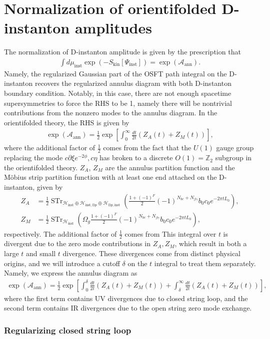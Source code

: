 \documentclass[12pt]{article}
\newcommand{\ie}{\begin{equation}\begin{aligned}}
\newcommand{\fe}{\end{aligned}\end{equation}}
\begin{document}
\section{Normalization of orientifolded D-instanton amplitudes}

The normalization of D-instanton amplitude is given by the prescription that 
\ie
\int d\mu_\text{inst}\exp(-S_\text{kin}[\Psi_\text{inst}]) = \exp(\mathcal{A}_{\text{ann}}).
\label{norm}
\fe
Namely, the regularized Gaussian part of the OSFT path integral on the D-instanton recovers the regularized annulus diagram with both D-instanton boundary condition. Notably, in this case, there are not enough spacetime supersymmetries to force the RHS to be 1, namely there will be nontrivial contributions from the nonzero modes to the annulus diagram. In the orientifolded theory, the RHS is given by
\ie
\exp(\mathcal{A}_{\text{ann}})= \frac{1}{2}\exp\left[\int_0^{\infty} \frac{dt}{2t}(Z_A(t)+Z_M(t))\right],
\fe
where the additional factor of $\frac{1}{2}$ comes from the fact that the $U(1)$ gauge group replacing the mode $c\partial \xi e^{-2\phi}, c\eta$ has broken to a discrete $O(1)=\mathbb{Z}_2$ subgroup in the orientifolded theory. $Z_A$, $Z_M$ are the annulus partition function and the M\"obius strip partition function with at least one end attached on the D-instanton, given by
\ie
Z_A&=\frac{1}{2}\operatorname{STr}_{\mathcal{H}_\text{inst} \oplus \mathcal{H}_{\text{inst}, \text{D}p}\oplus \mathcal{H}_{\text{D}p, \text{inst}}} \left(\frac{1+(-1)^F}{2}(-1)^{N_{b c}+N_{\beta \gamma}} b_0 c_0 e^{-2 \pi t L_0}\right),\\
Z_M&=\frac{1}{2}\operatorname{STr}_{\mathcal{H}_\text{inst}}\left(\Omega_g \frac{1+(-1)^F}{2}(-1)^{N_{b c}+N_{\beta \gamma}} b_0 c_0 e^{-2 \pi t L_0}\right),
\label{Zazm}
\fe
respectively. The additional factor of $\frac{1}{2}$ comes from  This integral over $t$ is divergent due to the zero mode contributions in $Z_A, Z_M$, which result in both a large $t$ and small $t$ divergence. These divergences come from distinct physical origins, and we will introduce a cutoff $\delta$ on the $t$ integral to treat them separately. Namely, we express the annulus diagram as
\ie
\exp(\mathcal{A}_\text{ann}) = \frac{1}{2}\exp\left[\int_0^\delta\frac{dt}{2t}(Z_A(t)+Z_M(t))+\int_\delta^\infty \frac{dt}{2t}(Z_A(t)+Z_M(t))\right],
\fe
where the first term contains UV divergences due to closed string loop, and the second term contains IR divergences due to the open string zero mode exchange. 

\subsubsection*{Regularizing closed string loop}
\end{document}
